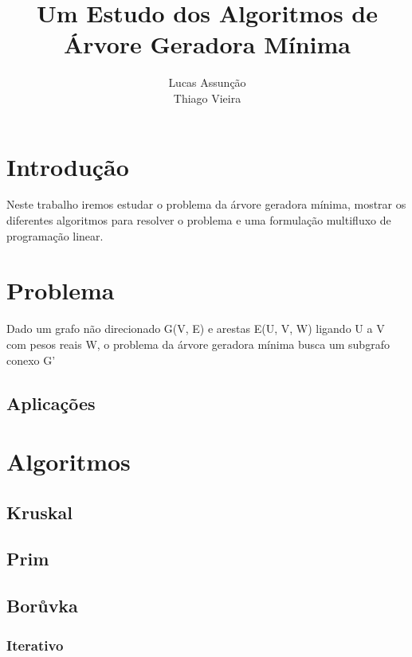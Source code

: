 \documentclass[11pt]{article}
\title{\textbf{Um Estudo dos Algoritmos de Árvore Geradora Mínima}}
\author{Lucas Assunção\\Thiago Vieira}
\date{}
\begin{document}
\maketitle

\section{Introdução}
Neste trabalho iremos estudar o problema da árvore geradora mínima, mostrar os diferentes algoritmos para resolver o problema e uma formulação multifluxo de programação linear.\\


\section{Problema}
Dado um grafo não direcionado G(V, E) e arestas E(U, V, W) ligando U a V com pesos reais W, o problema da árvore geradora mínima busca um subgrafo conexo G'

    \subsection{Aplicações}



\section{Algoritmos}

    \subsection{Kruskal}
    
    \subsection{Prim}
    
    \subsection{Borůvka}
        \subsubsection{Iterativo}
                
\end{document}
